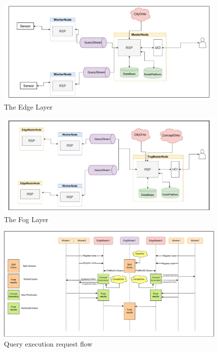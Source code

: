 \documentclass[5p,times]{elsarticle}
\begin{document}
\begin{figure}[t]
  \centering
  \includegraphics[width=\columnwidth]{EdgeLayer_New.drawio.pdf}
  \caption{The Edge Layer}
  \label{fig:edgelayer}
\end{figure}

\begin{figure}[t]
  \centering
  \includegraphics[width=\columnwidth]{FogLayer_New.drawio.pdf}
  \caption{The Fog Layer}
  \label{fig:foglayer}
\end{figure}


\begin{figure}[t] %
  \centering
  \includegraphics[width=\columnwidth]{Communication_new.drawio.pdf}
  \caption{Query execution request flow}
  \label{fig:queryexe}
\end{figure}
\end{document}
